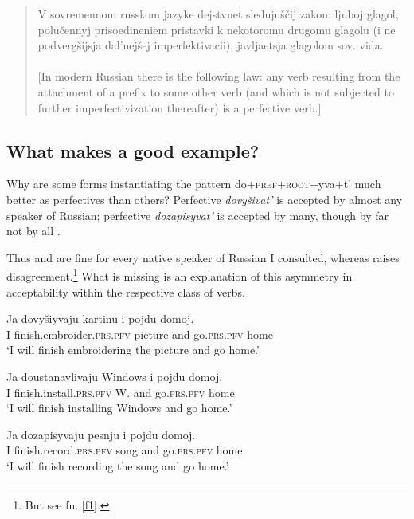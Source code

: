 \documentclass[output=paper,
colorlinks,
citecolor=brown,
newtxmath
]{langscibook}
\begin{document}
\begin{quote}
    V sovremennom russkom jazyke dejstvuet sledujuščij zakon: ljuboj glagol, polučennyj prisoedineniem pristavki k nekotoromu drugomu glagolu (i ne podvergšijsja dal'nejšej imperfektivacii), javljaetsja glagolom sov. vida.\\ \null\hfill\citep[67]{Zaliznjak.Smelev1997}\smallskip\\
    $[$In modern Russian there is the following law: any verb resulting from the attachment of a prefix to some other verb (and which is not subjected to further imperfectivization thereafter) is a perfective verb.$]$
\end{quote}


\subsection{What makes a good example?}

Why are some forms instantiating the pattern do$+$\textsc{pref}$+$\textsc{root}$+$yva$+$t' much better as perfectives than others? Perfective \textit{dovyšivat'} is accepted by almost any speaker of Russian; perfective \textit{dozapisyvat'} is accepted by many, though by far not by all
\citep[see][16--17]{Zinova2016}.

Thus  and  are fine for every native speaker of Russian I consulted, whereas  raises disagreement.\footnote{\label{f2}But see fn. \ref{f1}.} What is missing is an explanation of this asymmetry in acceptability within the respective class of verbs.

\ea\label{Zin6}
\gll Ja dovyšiyvaju kartinu i pojdu domoj.\\
I {finish.embroider.}\textsc{prs.pfv} picture and go.\textsc{prs.pfv} home\\
\glt `I will finish embroidering the picture and go home.'
\z

\ea\label{ustanav}
\gll Ja doustanavlivaju Windows i pojdu domoj.\\
I {finish.install.}\textsc{prs.pfv} W. and go.\textsc{prs.pfv} home\\
\glt `I will finish installing Windows and go home.'
\z

\ea\label{Zin5}
\gll Ja dozapisyvaju pesnju i pojdu domoj.\\
I {finish.record.}\textsc{prs.pfv} song and go.\textsc{prs.pfv} home\\
\glt `I will finish recording the song and go home.'
\z
\end{document}
